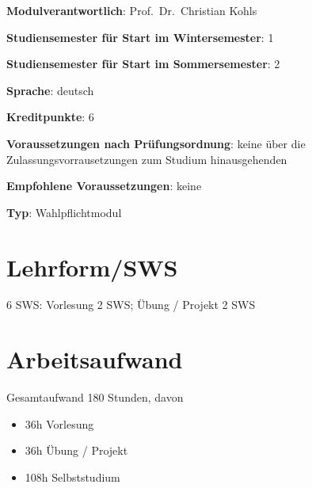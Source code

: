 \begin{modulHead}
\textbf{Modulverantwortlich}: Prof.~Dr.~Christian
Kohls
\end{modulHead}
\begin{modulHead}
\textbf{Studiensemester für
Start im Wintersemester}:
1
\end{modulHead}
\begin{modulHead}
\textbf{Studiensemester für Start
im Sommersemester}:
2
\end{modulHead}
\begin{modulHead}
\textbf{Sprache}:
deutsch
\end{modulHead}
\begin{modulHead}
\textbf{Kreditpunkte}:
6
\end{modulHead}
\begin{modulHead}
\textbf{Voraussetzungen nach
Prüfungsordnung}: keine über die Zulassungsvorrausetzungen zum Studium
hinausgehenden
\end{modulHead}
\begin{modulHead}
\textbf{Empfohlene
Voraussetzungen}: keine
\end{modulHead}
\begin{modulHead}
\textbf{Typ}:
Wahlpflichtmodul
\end{modulHead}


\section*{Lehrform/SWS\label{/mi-2017/modulbeschreibungen-master/MA_SC_WPF_CSCL}}\label{lehrformswspathlabelmi-2017modulbeschreibungen-mastermaux5fscux5fwpfux5fcscl}

6 SWS: Vorlesung 2 SWS; Übung / Projekt 2 SWS

\section*{Arbeitsaufwand\label{/mi-2017/modulbeschreibungen-master/MA_SC_WPF_CSCL}}\label{arbeitsaufwandpathlabelmi-2017modulbeschreibungen-mastermaux5fscux5fwpfux5fcscl}

Gesamtaufwand 180 Stunden, davon

\begin{itemize}
\tightlist
\item
  36h Vorlesung
\item
  36h Übung / Projekt
\item
  108h Selbststudium
\end{itemize}

